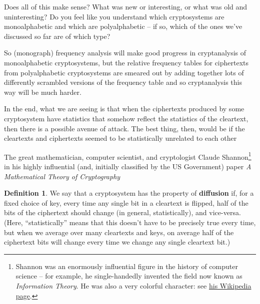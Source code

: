 \documentclass[12pt,letterpaper]{amsbook}
\theoremstyle{definition}
\newtheorem{definition}[theorem]{Definition}
\theoremstyle{remark}
\numberwithin{figure}{section}
\numberwithin{exercise}{chapter}
\numberwithin{section}{chapter}
\numberwithin{equation}{section}
\numberwithin{table}{subsection}
\newcommand{\bhref}[2]{\href{#1}{#2}}
\begin{document}
\vskip2mm
\begin{AZtcb}[label=az:monopolyalphabetic]{}{}
  Does all of this make sense?  What was new or interesting, or what was old
  and uninteresting?  Do you feel like you understand which cryptosystems
  are monoalphabetic and which are polyalphabetic -- if so, which of the ones
  we've discussed so far are of which type?
\end{AZtcb}

So (monograph) frequency analysis will make good progress in cryptanalysis
of monoalphabetic cryptosystems, but the relative frequency tables for
ciphertexts from polyalphabetic cryptosystems are smeared out by adding
together lots of differently scrambled versions of the frequency table and so
cryptanalysis this way will be much harder.

In the end, what we are seeing is that when the ciphertexts produced by some
cryptosystem have statistics that somehow reflect the statistics of the
cleartext, then there is a possible avenue of attack.  The best thing, then,
would be if the cleartexts and ciphertexts seemed to be statistically
unrelated to each other

The great mathematician, computer scientist, and cryptologist Claude Shannon\footnote{\tiny Shannon was an enormously influential figure in the history of computer science -- for example, he single-handedly invented the field now known as \textit{Information Theory}.  He
was also a very colorful character: see \bhref{https://en.wikipedia.org/wiki/Claude_Shannon}{his Wikipedia page}.} in his highly influential (and, initially
classified by the US Government) paper \textit{A Mathematical Theory of Cryptography}\cite{shannon1945mathcrypto}
\begin{definition}\label{def:diffusion}
We say that a cryptosystem has the property of \textbf{diffusion} if, for a
fixed choice of key, every time any single bit in a cleartext is flipped,
half of the bits of the ciphertext should change (in general, statistically),
and vice-versa.  (Here, ``statistically'' means that this doesn't have to be
precisely true every time, but when we average over many cleartexts and keys,
on average half of the ciphertext bits will change every time we change any
single cleartext bit.)
\end{definition}
\end{document}
